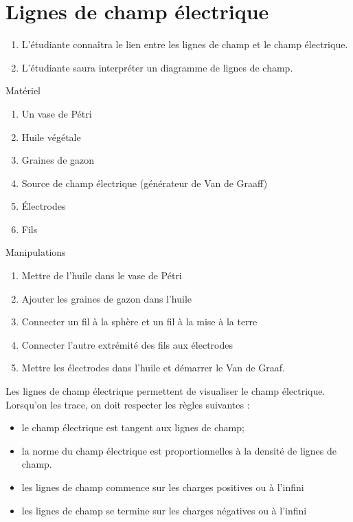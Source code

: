 \section{Lignes de champ électrique}


\begin{enumerate}
  \item L'étudiante connaîtra le lien entre les lignes de champ et le champ
    électrique.
  \item L'étudiante saura interpréter un diagramme de lignes de champ.
\end{enumerate}


  Matériel
  \begin{enumerate}
    \item Un vase de Pétri
    \item Huile végétale
    \item Graines de gazon
    \item Source de champ électrique (générateur de Van de Graaff)
    \item Électrodes
    \item Fils
  \end{enumerate}

  Manipulations
  \begin{enumerate}
    \item Mettre de l'huile dans le vase de Pétri
    \item Ajouter les graines de gazon dans l'huile
    \item Connecter un fil à la sphère et un fil à la mise à la terre
    \item Connecter l'autre extrémité des fils aux électrodes
    \item Mettre les électrodes dans l'huile et démarrer le Van de Graaf.
  \end{enumerate}



  Les lignes de champ électrique permettent de visualiser le champ électrique.
  Lorsqu'on les trace, on doit respecter les règles suivantes :

  \begin{itemize}
    \item le champ électrique est tangent aux lignes de champ;
    \item la norme du champ électrique est proportionnelles à la densité de
      lignes de champ.
    \item les lignes de champ commence sur les charges positives ou à l'infini
    \item les lignes de champ se termine sur les charges négatives ou à
      l'infini
  \end{itemize}

